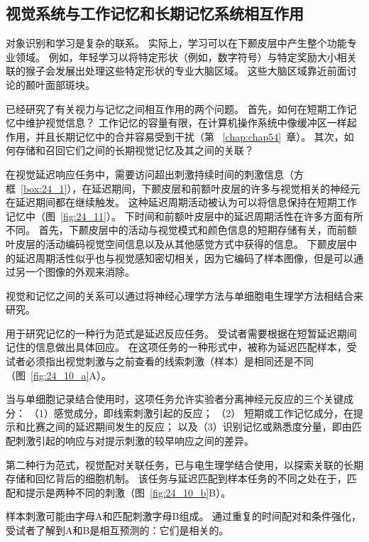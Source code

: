 \subsection{视觉系统与工作记忆和长期记忆系统相互作用}

对象识别和学习是复杂的联系。
实际上，学习可以在下颞皮层中产生整个功能专业领域。 
例如，年轻学习以将特定形状（例如，数字符号）与特定奖励大小相关联的猴子会发展出处理这些特定形状的专业大脑区域。
这些大脑区域靠近前面讨论的颞叶面部斑块。


已经研究了有关视力与记忆之间相互作用的两个问题。
首先，如何在短期工作记忆中维护视觉信息？
工作记忆的容量有限，在计算机操作系统中像缓冲区一样起作用，并且长期记忆中的合并容易受到干扰（第 ~\ref{chap:chap54}~章）。
其次，如何存储和召回它们之间的长期视觉记忆及其之间的关联？


在视觉延迟响应任务中，需要访问超出刺激持续时间的刺激信息（方框~\ref{box:24_1}），在延迟期间，下颞皮层和前额叶皮层的许多与视觉相关的神经元在延迟期间都在继续触发。
这种延迟周期活动被认为可以将信息保持在短期工作记忆中（图~\ref{fig:24_11}）。
下时间和前额叶皮层中的延迟周期活性在许多方面有所不同。
首先，下颞皮层中的活动与视觉模式和颜色信息的短期存储有关，而前额叶皮层的活动编码视觉空间信息以及从其他感觉方式中获得的信息。
下颞皮层中的延迟周期活性似乎也与视觉感知密切相关，因为它编码了样本图像，但是可以通过另一个图像的外观来消除。


\begin{proposition}[视觉与工作记忆的相互作用研究] \label{box:24_1}
	
	\quad \quad 视觉和记忆之间的关系可以通过将神经心理学方法与单细胞电生理学方法相结合来研究。
	
	\quad \quad 用于研究记忆的一种行为范式是延迟反应任务。
	受试者需要根据在短暂延迟期间记住的信息做出具体回应。
	在这项任务的一种形式中，被称为延迟匹配样本，受试者必须指出视觉刺激与之前查看的线索刺激（样本）是相同还是不同（图~\ref{fig:24_10_a}A）。
	
	\quad \quad 当与单细胞记录结合使用时，这项任务允许实验者分离神经元反应的三个关键成分：
	（1）感觉成分，即线索刺激引起的反应；
	（2） 短期或工作记忆成分，在提示和比赛之间的延迟期间发生的反应；
	以及（3）识别记忆或熟悉度分量，即由匹配刺激引起的响应与对提示刺激的较早响应之间的差异。
	
	\quad \quad 第二种行为范式，视觉配对关联任务，已与电生理学结合使用，以探索关联的长期存储和回忆背后的细胞机制。
	该任务与延迟匹配到样本任务的不同之处在于，匹配和提示是两种不同的刺激（图~\ref{fig:24_10_b}B）。
	
	\quad \quad 样本刺激可能由字母A和匹配刺激字母B组成。
	通过重复的时间配对和条件强化，受试者了解到A和B是相互预测的：它们是相关的。
	
\end{proposition}


